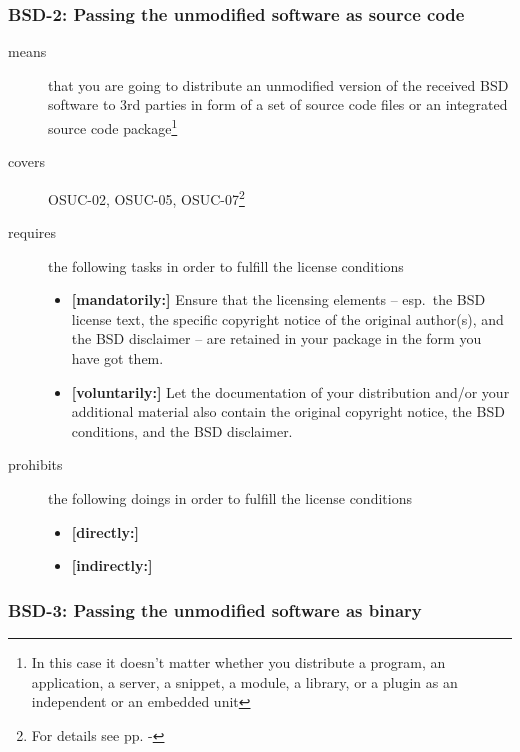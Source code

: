 \subsubsection{BSD-2: Passing the unmodified software as source code}
\label{OSUC-02-BSD} \label{OSUC-05-BSD} \label{OSUC-07-BSD} 

\begin{description}
\item[means] that you are going to distribute an unmodified version of the received
BSD software to 3rd parties in form of a set of source code files or an
integrated source code package\footnote{In this case it doesn't matter whether
you  distribute a program, an application, a server, a snippet, a module, a
library, or a plugin as an independent or an embedded unit} 

\item[covers] OSUC-02, OSUC-05, OSUC-07\footnote{For details see pp.
\pageref{OSUC-02-DEF} - \pageref{OSUC-07-DEF}}

\item[requires] the following tasks in order to fulfill the license conditions
\begin{itemize}
  \item \textbf{[mandatorily:]} Ensure that the licensing elements -- esp.\
  the BSD license text, the specific copyright notice of the original author(s),
  and the BSD disclaimer -- are retained in your package in the form you have got
  them.
  \item \textbf{[voluntarily:]} Let the documentation of your distribution
  and/or your additional material also contain the original copyright notice, the
  BSD conditions, and the BSD disclaimer.
\end{itemize}

\item[prohibits] the following doings in order to fulfill the license conditions
\begin{itemize}
  \item \textbf{[directly:]} 
  \item \textbf{[indirectly:]}
\end{itemize}
\end{description}

\subsubsection{BSD-3: Passing the unmodified software as binary}

